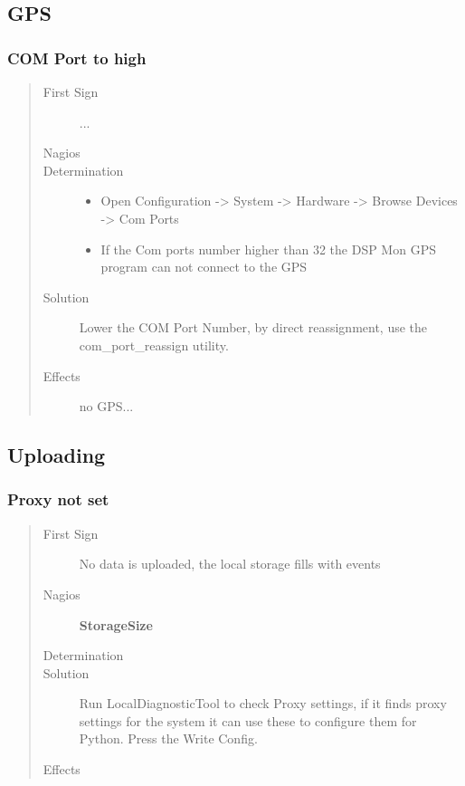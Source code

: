 \documentclass[a4paper,11pt,english]{sphinxmanual}
\begin{document}
\subsection{GPS}
\label{known-issues:gps}

\subsubsection{COM Port to high}
\label{known-issues:com-port-to-high}\begin{quote}\begin{description}
\item[{First Sign}] \leavevmode
...

\item[{Nagios}] \leavevmode
\item[{Determination}] \leavevmode\begin{itemize}
\item {} 
Open Configuration -\textgreater{} System -\textgreater{} Hardware -\textgreater{} Browse Devices -\textgreater{} Com Ports

\item {} 
If the Com ports number higher than 32 the DSP Mon GPS program can not connect to the GPS

\end{itemize}

\item[{Solution}] \leavevmode
Lower the COM Port Number, by direct reassignment, use the com\_port\_reassign utility.

\item[{Effects}] \leavevmode
no GPS...

\end{description}\end{quote}


\subsection{Uploading}
\label{known-issues:uploading}

\subsubsection{Proxy not set}
\label{known-issues:proxy-not-set}\begin{quote}\begin{description}
\item[{First Sign}] \leavevmode
No data is uploaded, the local storage fills with events

\item[{Nagios}] \leavevmode
\textbf{StorageSize}

\item[{Determination}] \leavevmode
\item[{Solution}] \leavevmode
Run LocalDiagnosticTool to check Proxy settings, if it finds proxy settings for the system it can use these to configure them for Python. Press the Write Config.

\item[{Effects}] \leavevmode
\end{description}\end{quote}
\end{document}
